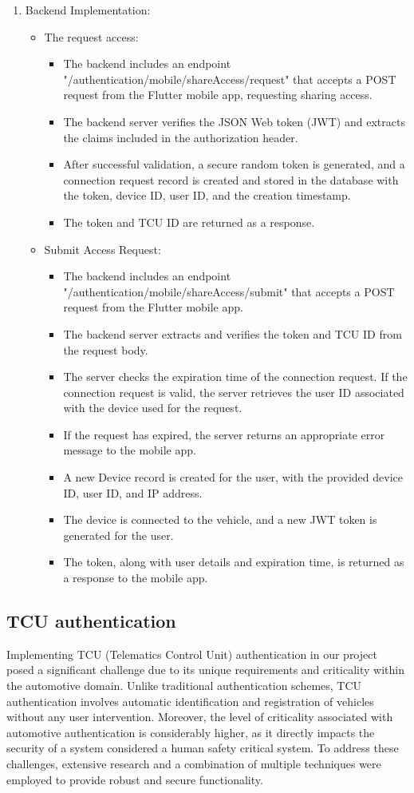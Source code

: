 \documentclass[
12pt,
oneside, 
onehalfspacing, 
nolistspacing, 
parskip, 
chapterinoneline, 
]{AASTCOMPUTER}
\begin{document}
\begin{enumerate}
\item Backend Implementation:
\begin{itemize}
\item The request access:
\begin{itemize}
\item The backend includes an endpoint "/authentication/mobile/shareAccess/request" that accepts a POST request from the Flutter mobile app, requesting sharing access.
\item The backend server verifies the JSON Web token (JWT) and extracts the claims included in the authorization header.
\item After successful validation, a secure random token is generated, and a connection request record is created and stored in the database with the token, device ID, user ID, and the creation timestamp.
\item The token and TCU ID are returned as a response.
\end{itemize}
\item Submit Access Request:
\begin{itemize}
\item The backend includes an endpoint "/authentication/mobile/shareAccess/submit" that accepts a POST request from the Flutter mobile app.
\item The backend server extracts and verifies the token and TCU ID from the request body.
\item The server checks the expiration time of the connection request. If the connection request is valid, the server retrieves the user ID associated with the device used for the request.
\item If the request has expired, the server returns an appropriate error message to the mobile app.
\item A new Device record is created for the user, with the provided device ID, user ID, and IP address.
\item The device is connected to the vehicle, and a new JWT token is generated for the user.
\item The token, along with user details and expiration time, is returned as a response to the mobile app.
\end{itemize}
\end{itemize}
\end{enumerate}
\subsection{TCU authentication}
Implementing TCU (Telematics Control Unit) authentication in our project posed a significant challenge due to its unique requirements and criticality within the automotive domain. Unlike traditional authentication schemes, TCU authentication involves automatic identification and registration of vehicles without any user intervention. Moreover, the level of criticality associated with automotive authentication is considerably higher, as it directly impacts the security of a system considered a human safety critical system. To address these challenges, extensive research and a combination of multiple techniques were employed to provide robust and secure functionality.
\end{document}
